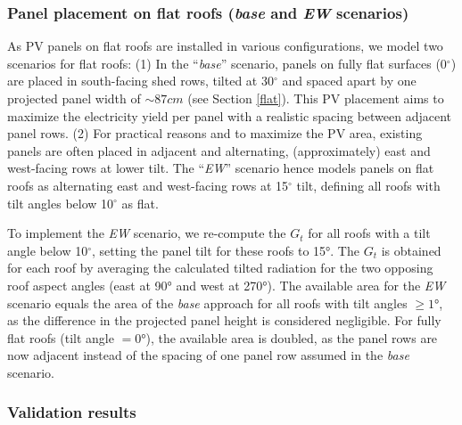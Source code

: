 \subsubsection{Panel placement on flat roofs (\textit{base} and \textit{EW} scenarios)}
As PV panels on flat roofs are installed in various configurations, we model two scenarios for flat roofs: (1) In the “\textit{base}” scenario, panels on fully flat surfaces (0$^\circ$) are placed in south-facing shed rows, tilted at 30$^\circ$ and spaced apart by one projected panel width of $\sim 87 cm$ (see Section \ref{flat}). This PV placement aims to maximize the electricity yield per panel with a realistic spacing between adjacent panel rows. (2) For practical reasons and to maximize the PV area, existing panels are often placed in adjacent and alternating, (approximately) east and west-facing rows at lower tilt. The “\textit{EW}” scenario hence models panels on flat roofs as alternating east and west-facing rows at 15$^\circ$ tilt, defining all roofs with tilt angles below 10$^\circ$ as flat.

To implement the \textit{EW} scenario, we re-compute the $G_t$ for all roofs with a tilt angle below 10$^\circ$, setting the panel tilt for these roofs to 15°. The $G_t$ is obtained for each roof by averaging the calculated tilted radiation for the two opposing roof aspect angles (east at 90° and west at 270°).
The available area for the \textit{EW} scenario equals the area of the \textit{base} approach for all roofs with tilt angles $\geq 1$°, as the difference in the projected panel height is considered negligible. For fully flat roofs (tilt angle $= 0$°), the available area is doubled, as the panel rows are now adjacent instead of the spacing of one panel row assumed in the \textit{base} scenario.

\subsubsection{Validation results}

